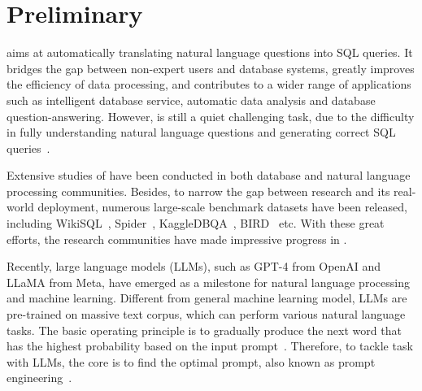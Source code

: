 \section{Preliminary}
\label{sec:preliminary}

\nlsql aims at automatically translating natural language questions into SQL queries. 
It bridges the gap between non-expert users and database systems, greatly improves the efficiency of data processing, and contributes to a wider range of applications such as intelligent database service, automatic data analysis and database question-answering.  
However, \nlsql is still a quiet challenging task, due to the difficulty in fully understanding natural language questions and generating correct SQL queries~\cite{DBLP:journals/corr/abs-2208-13629,nl2sql1}. 

Extensive studies of \nlsql have been conducted in both database and natural language processing communities. 
Besides, to narrow the gap between \nlsql research and its real-world deployment, numerous large-scale benchmark datasets have been released, including WikiSQL~\cite{wikisql}, Spider~\cite{spider}, KaggleDBQA~\cite{kaggledbqa}, BIRD~\cite{DBLP:journals/corr/abs-2305-03111} etc. 
With these great efforts, the research communities have made impressive progress in \nlsql. 

Recently, large language models (LLMs), such as GPT-4 \cite{gpt4} from OpenAI and LLaMA \cite{llama} from Meta, have emerged as a milestone for natural language processing and machine learning. 
Different from general machine learning model, LLMs are pre-trained on massive text corpus, which can perform various natural language tasks.
The basic operating principle is to gradually produce the next word that has the highest probability based on the input prompt~\cite{DBLP:journals/corr/abs-2303-18223}. 
Therefore, to tackle \nlsql task with LLMs, the core is to find the optimal prompt, also known as prompt engineering~\cite{enhancing, DBLP:journals/corr/abs-2303-13547}. 

